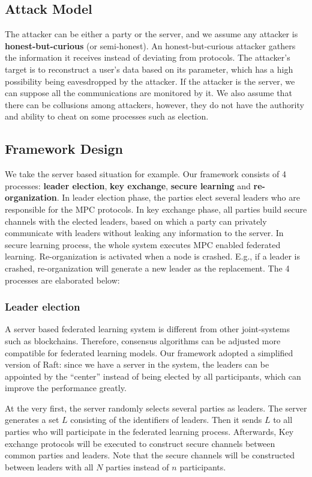 \subsection{Attack Model}
The attacker can be either a party or the server, and we assume any attacker is \textbf{honest-but-curious} (or semi-honest). An honest-but-curious attacker gathers the information it receives instead of deviating from protocols. The attacker's target is to reconstruct a user's data based on its parameter, which has a high possibility being eavesdropped by the attacker. If the attacker is the server, we can suppose all the communications are monitored by it. We also assume that there can be collusions among attackers, however, they do not have the authority and ability to cheat on some processes such as election.


\subsection{Framework Design}
We take the server based situation for example. Our framework consists of 4 processes: \textbf{leader election}, \textbf{key exchange}, \textbf{secure learning} and \textbf{re-organization}. In leader election phase, the parties elect several leaders who are responsible for the MPC protocols. In key exchange phase, all parties build secure channels with the elected leaders, based on which a party can privately communicate with leaders without leaking any information to the server. In secure learning process, the whole system executes MPC enabled federated learning. Re-organization is activated when a node is crashed. E.g., if a leader is crashed, re-organization will generate a new leader as the replacement. The 4 processes are elaborated below:

\subsubsection{\textbf{Leader election}}
A server based federated learning system is different from other joint-systems such as blockchains. Therefore, consensus algorithms can be adjusted more compatible for federated learning models. Our framework adopted a simplified version of Raft: since we have a server in the system, the leaders can be appointed by the ``center'' instead of being elected by all participants, which can improve the performance greatly. 

At the very first, the server randomly selects several parties as leaders. The server generates a set $L$ consisting of the identifiers of leaders. Then it sends $L$ to all parties who will participate in the federated learning process. Afterwards, Key exchange protocols will be executed to construct secure channels between common parties and leaders. Note that the secure channels will be constructed between leaders with all $N$ parties instead of $n$ participants.

